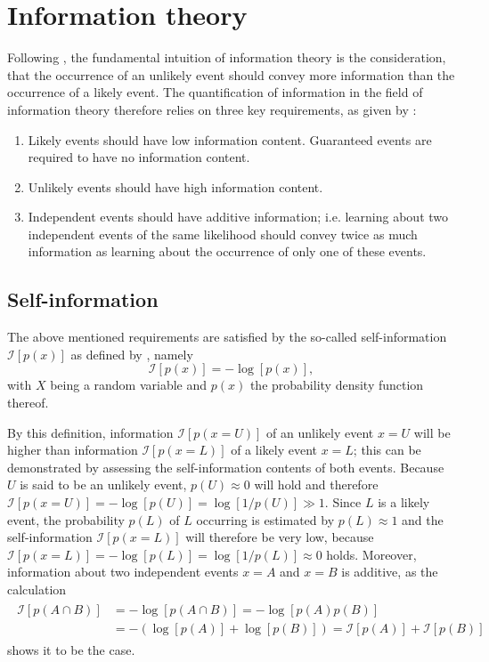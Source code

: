 \documentclass[a4paper,12pt]{report}
\begin{document}
\section{Information theory}
Following \cite[p.73]{Goodfellow.2016}, the fundamental intuition of information theory is the consideration, that the occurrence of an unlikely event should convey more information than the occurrence of a likely event. The quantification of information in the field of information theory therefore relies on three key requirements, as given by \cite[p.73]{Goodfellow.2016}:
\begin{enumerate}
\item Likely events should have low information content. Guaranteed events are required to have no information content.
\item Unlikely events should have high information content.
\item Independent events should have additive information; i.e. learning about two independent events of the same likelihood should convey twice as much information as learning about the occurrence of only one of these events.
\end{enumerate} %

\subsection{Self-information}
The above mentioned requirements are satisfied by the so-called self-information $\mathcal{I}[p(x)]$ as defined by \cite[p.73]{Goodfellow.2016}, namely \begin{equation}\label{eq:defselfinformation}
\mathcal{I}[p(x)] = -\log\left[p(x)\right],
\end{equation} with $X$ being a random variable and $p(x)$ the probability density function thereof.

By this definition, information $\mathcal{I}[p(x=U)]$ of an unlikely event $x=U$ will be higher than information $\mathcal{I}[p(x=L)]$ of a likely event $x = L$; this can be demonstrated by assessing the self-information contents of both events. Because $U$ is said to be an unlikely event, $p(U) \approx 0$ will hold and therefore $\mathcal{I}[p(x=U)] = -\log[p(U)] = \log[1/p(U)] \gg 1$. Since $L$ is a likely event, the probability $p(L)$ of $L$ occurring is estimated by $p(L) \approx 1$ and the self-information $\mathcal{I}[p(x=L)]$ will therefore be very low, because $\mathcal{I}[p(x=L)] = -\log[p(L)] = \log[1/p(L)] \approx 0$ holds. Moreover, information about two independent events $x=A$ and $x=B$ is additive, as the calculation
\begin{align}
\begin{aligned} \mathcal{I}[p(A\cap B)] &= -\log[p(A\cap B)] = -\log[p(A)p(B)] \\ &= -(\log[p(A)] + \log[p(B)]) = \mathcal{I}[p(A)] + \mathcal{I}[p(B)]
\end{aligned}
\end{align} shows it to be the case.
\end{document}
